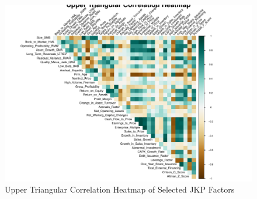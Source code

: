 \documentclass[t]{beamer}\usepackage[]{graphicx}\usepackage[table]{xcolor}
\makeatletter
\def\maxwidth{ %
  \ifdim\Gin@nat@width>\linewidth
    \linewidth
  \else
    \Gin@nat@width
  \fi
}
\newenvironment{knitrout}{}{} %
\makeatother
\begin{document}
\begin{frame}
\begin{knitrout}
\color{fgcolor}\begin{figure}

{\centering \includegraphics[width=\maxwidth]{figure/corr_heatmap1-1} 

}

\caption[Upper Triangular Correlation Heatmap of Selected JKP Factors]{Upper Triangular Correlation Heatmap of Selected JKP Factors}\label{fig:corr_heatmap1}
\end{figure}

\end{knitrout}

\end{frame}
\end{document}
